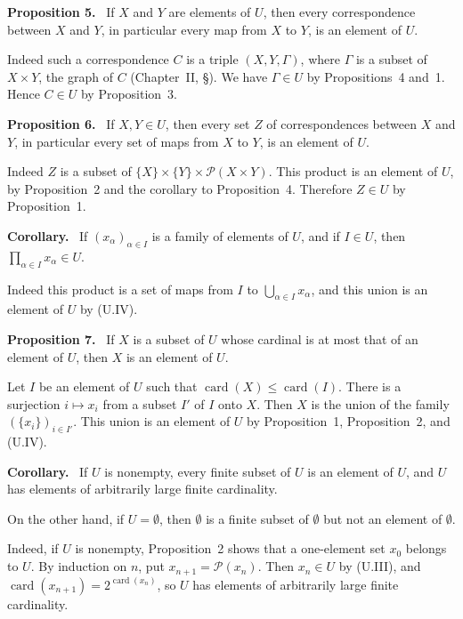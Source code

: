 \documentclass[11pt]{article}
\newcommand{\card}{\operatorname{card}}
\newcommand{\Pset}{\mathcal{P}}
\newenvironment{statement}[1]{\par\medskip\noindent\textbf{#1.}\ }{\par\medskip}
\begin{document}
\begin{statement}{Proposition 5}
If \(X\) and \(Y\) are elements of \(U\), then every correspondence between \(X\) and \(Y\), in particular every map from \(X\) to \(Y\), is an element of \(U\).
\end{statement}
Indeed such a correspondence \(C\) is a triple \((X,Y,\Gamma)\), where \(\Gamma\) is a subset of \(X\times Y\), the graph of \(C\) (Chapter~II, \S{}). We have \(\Gamma\in U\) by Propositions~4 and~1. Hence \(C\in U\) by Proposition~3.

\begin{statement}{Proposition 6}
If \(X,Y\in U\), then every set \(Z\) of correspondences between \(X\) and \(Y\), in particular every set of maps from \(X\) to \(Y\), is an element of \(U\).
\end{statement}
Indeed \(Z\) is a subset of \(\{X\}\times\{Y\}\times\Pset(X\times Y)\). This product is an element of \(U\), by Proposition~2 and the corollary to Proposition~4. Therefore \(Z\in U\) by Proposition~1.

\begin{statement}{Corollary}
If \((x_\alpha)_{\alpha\in I}\) is a family of elements of \(U\), and if \(I\in U\), then \(\prod_{\alpha\in I}x_\alpha\in U\).
\end{statement}
Indeed this product is a set of maps from \(I\) to \(\bigcup_{\alpha\in I}x_\alpha\), and this union is an element of \(U\) by (U.IV).

\begin{statement}{Proposition 7}
If \(X\) is a subset of \(U\) whose cardinal is at most that of an element of \(U\), then \(X\) is an element of \(U\).
\end{statement}
Let \(I\) be an element of \(U\) such that \(\card(X)\leq\card(I)\). There is a surjection \(i\mapsto x_i\) from a subset \(I'\) of \(I\) onto \(X\). Then \(X\) is the union of the family \((\{x_i\})_{i\in I'}\). This union is an element of \(U\) by Proposition~1, Proposition~2, and (U.IV).

\begin{statement}{Corollary}
If \(U\) is nonempty, every finite subset of \(U\) is an element of \(U\), and \(U\) has elements of arbitrarily large finite cardinality.
\end{statement}
On the other hand, if \(U=\emptyset\), then \(\emptyset\) is a finite subset of \(\emptyset\) but not an element of \(\emptyset\).

Indeed, if \(U\) is nonempty, Proposition~2 shows that a one-element set \(x_0\) belongs to \(U\). By induction on \(n\), put \(x_{n+1}=\Pset(x_n)\). Then \(x_n\in U\) by (U.III), and \(\card(x_{n+1})=2^{\card(x_n)}\), so \(U\) has elements of arbitrarily large finite cardinality.
\end{document}

